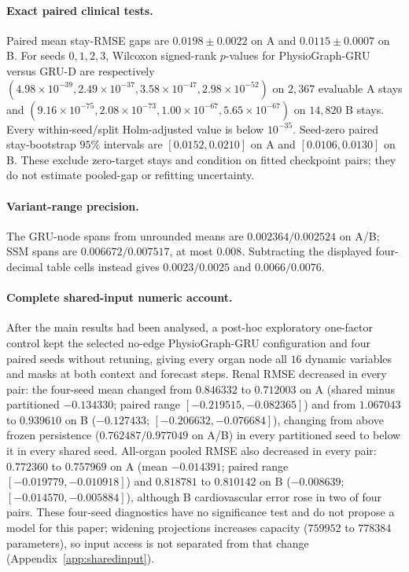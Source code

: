 \paragraph{Exact paired clinical tests.}\label{app:pairedexact}
Paired mean stay-RMSE gaps are $0.0198\pm0.0022$ on A and $0.0115\pm0.0007$ on B. For seeds $0,1,2,3$, Wilcoxon signed-rank $p$-values for PhysioGraph-GRU versus GRU-D are respectively $(4.98\!\times\!10^{-39},\allowbreak 2.49\!\times\!10^{-37},\allowbreak 3.58\!\times\!10^{-47},\allowbreak 2.98\!\times\!10^{-52})$ on $2{,}367$ evaluable A stays and $(9.16\!\times\!10^{-75},\allowbreak 2.08\!\times\!10^{-73},\allowbreak 1.00\!\times\!10^{-67},\allowbreak 5.65\!\times\!10^{-67})$ on $14{,}820$ B stays. Every within-seed/split Holm-adjusted value is below $10^{-35}$. Seed-zero paired stay-bootstrap $95\%$ intervals are $[0.0152,0.0210]$ on A and $[0.0106,0.0130]$ on B. These exclude zero-target stays and condition on fitted checkpoint pairs; they do not estimate pooled-gap or refitting uncertainty.

\paragraph{Variant-range precision.}\label{app:variantprecision}
The GRU-node spans from unrounded means are $0.002364/0.002524$ on A/B; SSM spans are $0.006672/0.007517$, at most $0.008$. Subtracting the displayed four-decimal table cells instead gives $0.0023/0.0025$ and $0.0066/0.0076$.

\paragraph{Complete shared-input numeric account.}
After the main results had been analysed, a post-hoc exploratory one-factor control kept the selected no-edge PhysioGraph-GRU configuration and four paired seeds without retuning, giving every organ node all $16$ dynamic variables and masks at both context and forecast steps.
Renal RMSE decreased in every pair: the four-seed mean changed from $0.846332$ to $0.712003$ on A (shared minus partitioned $-0.134330$; paired range $[-0.219515,-0.082365]$) and from $1.067043$ to $0.939610$ on B ($-0.127433$; $[-0.206632,-0.076684]$), changing from above frozen persistence ($0.762487/0.977049$ on A/B) in every partitioned seed to below it in every shared seed.
All-organ pooled RMSE also decreased in every pair: $0.772360$ to $0.757969$ on A (mean $-0.014391$; paired range $[-0.019779,-0.010918]$) and $0.818781$ to $0.810142$ on B ($-0.008639$; $[-0.014570,-0.005884]$), although B cardiovascular error rose in two of four pairs.
These four-seed diagnostics have no significance test and do not propose a model for this paper; widening projections increases capacity ($759952$ to $778384$ parameters), so input access is not separated from that change (Appendix~\ref{app:sharedinput}).


